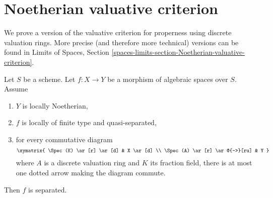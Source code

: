 \section{Noetherian valuative criterion}
\label{section-Noetherian-valuative-criterion}

\noindent
We prove a version of the valuative criterion for properness
using discrete valuation rings. More precise (and therefore more
technical) versions can be found in
Limits of Spaces, Section
\ref{spaces-limits-section-Noetherian-valuative-criterion}.

\begin{lemma}
\label{lemma-check-separated-dvr}
Let $S$ be a scheme. Let $f : X \to Y$ be a morphism of algebraic
spaces over $S$. Assume
\begin{enumerate}
\item $Y$ is locally Noetherian,
\item $f$ is locally of finite type and quasi-separated,
\item for every commutative diagram
$$
\xymatrix{
\Spec(K) \ar[r] \ar[d] & X \ar[d] \\
\Spec(A) \ar[r] \ar@{-->}[ru] & Y
}
$$
where $A$ is a discrete valuation ring and $K$ its fraction field,
there is at most one dotted arrow making the diagram commute.
\end{enumerate}
Then $f$ is separated.
\end{lemma}


